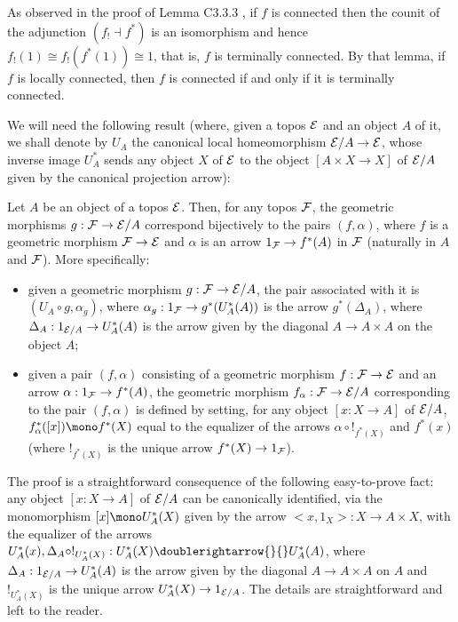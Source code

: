 \documentclass[a4paper,12pt]{article}
\begin{document}
As observed in the proof of Lemma C3.3.3 \cite{El}, if $f$ is connected then the counit of the adjunction $(f_{!}\dashv f^{\ast})$ is an isomorphism and hence $f_{!}(1)\cong f_{!}(f^{\ast}(1))\cong 1$, that is, $f$ is terminally connected. By that lemma, if $f$ is locally connected, then $f$ is connected if and only if it is terminally connected. 

We will need the following result (where, given a topos $\cal E$ and an object $A$ of it, we shall denote by $U_{A}$ the canonical local homeomorphism ${\cal E}\slash A \to {\cal E}$, whose inverse image $U_{A}^{\ast}$ sends any object $X$ of $\cal E$ to the object $[A\times X\to X]$ of ${\cal E}\slash A$ given by the canonical projection arrow):

\begin{lemma}\label{lemmaslicetoposclassification}
	Let $A$ be an object of a topos $\cal E$. Then, for any topos $\cal F$, the geometric morphisms $g:{\cal F}\to {\cal E}\slash A$ correspond bijectively to the pairs $(f, \alpha)$, where $f$ is a geometric morphism ${\cal F}\to {\cal E}$ and $\alpha$ is an arrow $1_{\cal F}\to f^{\ast}(A)$ in $\cal F$ (naturally in $A$ and $\cal F$). More specifically:	
	\begin{itemize}
		\item given a geometric morphism $g:{\cal F}\to {\cal E}\slash A$, the pair associated with it is $(U_{A}\circ g, \alpha_{g})$, where $\alpha_{g}:1_{\cal F}\to g^{\ast}(U_{A}^{\ast}(A))$ is the arrow $g^{\ast}(\Delta_{A})$, where $\Delta_{A}:1_{{\cal E}\slash A}\to U_{A}^{\ast}(A)$ is the arrow given by the diagonal $A\to A\times A$ on the object $A$; 
		
		\item given a pair $(f, \alpha)$ consisting of a geometric morphism $f:{\cal F}\to {\cal E}$ and an arrow $\alpha:1_{\cal F} \to f^{\ast}(A)$, the geometric morphism $f_{\alpha}:{\cal F}\to {\cal E}\slash A$ corresponding to the pair $(f, \alpha)$ is defined by setting, for any object $[x:X\to A]$ of ${\cal E}\slash A$, $f_{\alpha}^{\ast}([x])\mono f^{\ast}(X)$ equal to the equalizer of the arrows $\alpha\circ !_{f^{\ast}(X)}$ and $f^{\ast}(x)$ (where $!_{f^{\ast}(X)}$ is the unique arrow $f^{\ast}(X)\to 1_{\cal F}$).
	\end{itemize} 		 
\end{lemma}

\begin{proofs}
	The proof is a straightforward consequence of the following easy-to-prove fact: any object $[x:X\to A]$ of ${\cal E}\slash A$ can be canonically identified, via the monomorphism $[x]\mono U_{A}^{\ast}(X)$ given by the arrow $<x, 1_{X}>:X\to A\times X$, with the equalizer of the arrows $U_{A}^{\ast}(x), \Delta_{A}\circ !_{U_{A}^{\ast}(X)}:U_{A}^{\ast}(X) \doublerightarrow{}{}   U_{A}^{\ast}(A)$, where $\Delta_{A}:1_{{\cal E}\slash A}\to U_{A}^{\ast}(A)$ is the arrow given by the diagonal $A\to A\times A$ on $A$ and $!_{U_{A}^{\ast}(X)}$ is the unique arrow $U_{A}^{\ast}(X) \to 1_{{\cal E}\slash A}$. The details are straightforward and left to the reader.
\end{proofs}
\end{document}
